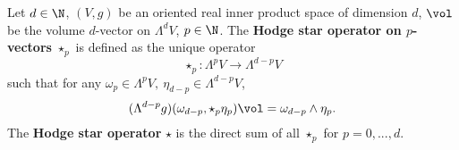 \begin{definition}
  Let
    $d \in \N$,
    $(V, g)$ be an oriented real inner product space of dimension $d$,
    $\vol$ be the volume $d$-vector on $\Lambda^d V$,
    $p \in \N$.
  The \textbf{Hodge star operator on $p$-vectors} $\star_p$
  is defined as the unique operator
  \begin{equation}
    \star_p \colon \Lambda^p V \to \Lambda^{d - p} V
  \end{equation}
  such that for any
  $\omega_p \in \Lambda^p V,\ \eta_{d - p} \in \Lambda^{d - p} V$,
  \begin{equation}
    (\Lambda^{d - p} g)(\omega_{d - p}, \star_p \eta_p) \vol
    = \omega_{d - p} \wedge \eta_p.
  \end{equation}
  The \textbf{Hodge star operator} $\star$ is the direct sum of all $\star_p$
  for $p = 0, ..., d$.
\end{definition}
